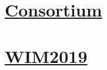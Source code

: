 \documentclass[onsided]{book}
\numberwithin{equation}{section}
\begin{document}
\chapter{\href{https://www.romsoc.eu/consortium/}{Consortium}}


\chapter{\href{https://www.romsoc.eu/wim2019/}{WIM2019}}


\printbibliography[heading=bibintoc]
\end{document}
